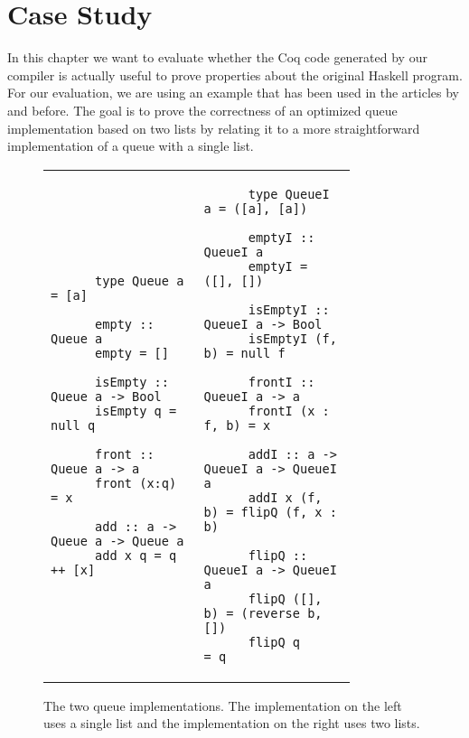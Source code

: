 \chapter{Case Study} \label{chp:case-study}
In this chapter we want to evaluate whether the Coq code generated by our compiler is actually useful to prove properties about the original Haskell program.
For our evaluation, we are using an example that has been used in the articles by \cite{Abel:2005} and \cite{Dylus:2018} before.
The goal is to prove the correctness of an optimized queue implementation based on two lists by relating it to a more straightforward implementation of a queue with a single list.

\begin{figure}[H]
  \begin{tabular}{p{0.40\linewidth} | p{0.40\linewidth}}
    \begin{verbatim}
      type Queue a = [a]

      empty :: Queue a
      empty = []

      isEmpty :: Queue a -> Bool
      isEmpty q = null q

      front :: Queue a -> a
      front (x:q) = x

      add :: a -> Queue a -> Queue a
      add x q = q ++ [x]
    \end{verbatim}
    &
    \begin{verbatim}
      type QueueI a = ([a], [a])

      emptyI :: QueueI a
      emptyI = ([], [])

      isEmptyI :: QueueI a -> Bool
      isEmptyI (f, b) = null f

      frontI :: QueueI a -> a
      frontI (x : f, b) = x

      addI :: a -> QueueI a -> QueueI a
      addI x (f, b) = flipQ (f, x : b)

      flipQ :: QueueI a -> QueueI a
      flipQ ([], b) = (reverse b, [])
      flipQ q       = q
    \end{verbatim}
  \end{tabular}
  \caption{
    The two queue implementations.
    The implementation on the left uses a single list and the implementation on the right uses two lists.
  }
  \label{fig:case-study:original-queues}
\end{figure}

